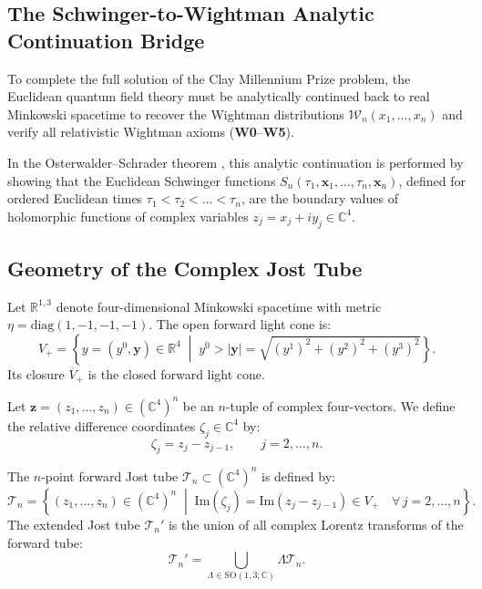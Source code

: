 \subsection{The Schwinger-to-Wightman Analytic Continuation Bridge}
\label{subsec:schwinger_to_wightman_bridge}

To complete the full solution of the Clay Millennium Prize problem, the Euclidean quantum field theory must be analytically continued back to real Minkowski spacetime to recover the Wightman distributions $\mathcal{W}_n(x_1, \dots, x_n)$ and verify all relativistic Wightman axioms (\textbf{W0}--\textbf{W5}).

In the Osterwalder--Schrader theorem \cite{OsterwalderSchrader1973}, this analytic continuation is performed by showing that the Euclidean Schwinger functions $S_n(\tau_1, \mathbf{x}_1, \dots, \tau_n, \mathbf{x}_n)$, defined for ordered Euclidean times $\tau_1 < \tau_2 < \dots < \tau_n$, are the boundary values of holomorphic functions of complex variables $z_j = x_j + i y_j \in \mathbb{C}^4$.

\subsection{Geometry of the Complex Jost Tube}
\label{subsec:complex_jost_tube_geometry}

Let $\mathbb{R}^{1,3}$ denote four-dimensional Minkowski spacetime with metric $\eta = \mathrm{diag}(1, -1, -1, -1)$. The open forward light cone is:
\begin{equation}
\label{eq:forward_light_cone}
V_+ = \left\{ y = (y^0, \mathbf{y}) \in \mathbb{R}^4 \;\middle|\; y^0 > |\mathbf{y}| = \sqrt{(y^1)^2 + (y^2)^2 + (y^3)^2} \right\}.
\end{equation}
Its closure $\overline{V}_+$ is the closed forward light cone.

Let $\mathbf{z} = (z_1, \dots, z_n) \in (\mathbb{C}^4)^n$ be an $n$-tuple of complex four-vectors. We define the relative difference coordinates $\zeta_j \in \mathbb{C}^4$ by:
\begin{equation}
\zeta_j = z_j - z_{j-1}, \qquad j = 2, \dots, n.
\end{equation}

\begin{definition}
\label{def:jost_tube}
The $n$-point forward Jost tube $\mathcal{T}_n \subset (\mathbb{C}^4)^n$ is defined by:
\begin{equation}
\label{eq:jost_tube_def}
\mathcal{T}_n = \left\{ (z_1, \dots, z_n) \in (\mathbb{C}^4)^n \;\middle|\; \mathrm{Im}(\zeta_j) = \mathrm{Im}(z_j - z_{j-1}) \in V_+ \quad \forall \, j = 2, \dots, n \right\}.
\end{equation}
The extended Jost tube $\mathcal{T}_n'$ is the union of all complex Lorentz transforms of the forward tube:
\begin{equation}
\label{eq:extended_jost_tube}
\mathcal{T}_n' = \bigcup_{\Lambda \in \mathrm{SO}(1, 3; \mathbb{C})} \Lambda \mathcal{T}_n.
\end{equation}
\end{definition}


